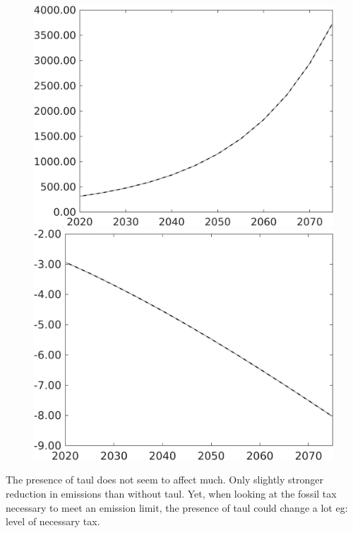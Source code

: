 \documentclass[12pt]{article}
\begin{document}
\begin{figure}[h!!]
\begin{minipage}[]{0.32\textwidth}
\end{minipage}		
\begin{minipage}[]{0.32\textwidth}
\includegraphics[width=1\textwidth]{../../codding_model/own_basedOnFried/optimalPol_010922_revision/figures/all_13Sept22/PerdifNoTauf_regime0_CompTaul_GFF_spillover0_nsk1_xgr1_knspil1_sep1_LFlimit0_emsbase0_countec0_GovRev0_etaa0.79_lgd0.png}
\end{minipage}		
\begin{minipage}[]{0.32\textwidth}
\includegraphics[width=1\textwidth]{../../codding_model/own_basedOnFried/optimalPol_010922_revision/figures/all_13Sept22/PerdifNoTauf_regime0_CompTaul_EY_spillover0_nsk1_xgr1_knspil1_sep1_LFlimit0_emsbase0_countec0_GovRev0_etaa0.79_lgd0.png}
\end{minipage}	
\end{figure}
The presence of taul does not seem to affect much. Only slightly stronger reduction in emissions than without taul. Yet, when looking at the fossil tax necessary to meet an emission limit, the presence of taul could change a lot eg: level of necessary tax. 
\end{document}

